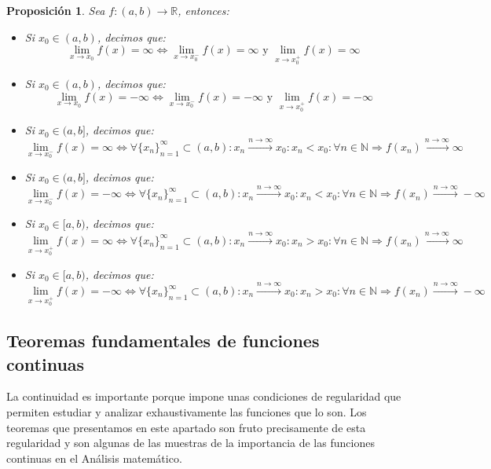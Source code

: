 \documentclass[10pt,a4paper,openright]{book}
\theoremstyle{break}
\newtheorem{prop}{Proposición}[chapter]
\begin{document}
\begin{prop}
Sea $f: (a,b)\longrightarrow \mathbb R$, entonces:
\begin{itemize}
\item Si $x_0\in (a,b)$, decimos que:
$$\lim_{x\rightarrow x_0}f(x)=\infty\Leftrightarrow \lim_{x\rightarrow x_0^-}f(x)=\infty \text{ y } \lim_{x\rightarrow x_0^+}f(x)=\infty$$

\item Si $x_0\in (a,b)$, decimos que:
$$\lim_{x\rightarrow x_0}f(x)=-\infty\Leftrightarrow \lim_{x\rightarrow x_0^-}f(x)=-\infty \text{ y } \lim_{x\rightarrow x_0^+}f(x)=-\infty$$

\item Si $x_0\in (a,b]$, decimos que:
$$\lim_{x\rightarrow x_0^-}f(x)=\infty\Leftrightarrow \forall \{x_n\}_{n=1}^\infty \subset (a,b): x_n\xrightarrow{n\rightarrow\infty} x_0: x_n<x_0: \forall n\in \mathbb N\Rightarrow f(x_n)\xrightarrow{n\rightarrow \infty} \infty$$

\item Si $x_0\in (a,b]$, decimos que:
$$\lim_{x\rightarrow x_0^-}f(x)=-\infty\Leftrightarrow \forall \{x_n\}_{n=1}^\infty \subset (a,b): x_n\xrightarrow{n\rightarrow\infty} x_0: x_n<x_0: \forall n\in \mathbb N\Rightarrow f(x_n)\xrightarrow{n\rightarrow \infty} -\infty$$

\item Si $x_0\in [a,b)$, decimos que:
$$\lim_{x\rightarrow x_0^+}f(x)=\infty\Leftrightarrow \forall \{x_n\}_{n=1}^\infty \subset (a,b): x_n\xrightarrow{n\rightarrow\infty} x_0: x_n>x_0: \forall n\in \mathbb N\Rightarrow f(x_n)\xrightarrow{n\rightarrow \infty} \infty$$

\item Si $x_0\in [a,b)$, decimos que:
$$\lim_{x\rightarrow x_0^+}f(x)=-\infty\Leftrightarrow \forall \{x_n\}_{n=1}^\infty \subset (a,b): x_n\xrightarrow{n\rightarrow\infty} x_0: x_n>x_0: \forall n\in \mathbb N\Rightarrow f(x_n)\xrightarrow{n\rightarrow \infty} -\infty$$
\end{itemize}
\end{prop}

\subsection{Teoremas fundamentales de funciones continuas}
La continuidad es importante porque impone unas condiciones de regularidad que permiten estudiar y analizar exhaustivamente las funciones que lo son. Los teoremas que presentamos en este apartado son fruto precisamente de esta regularidad y son algunas de las muestras de la importancia de las funciones continuas en el Análisis matemático.
\end{document}
